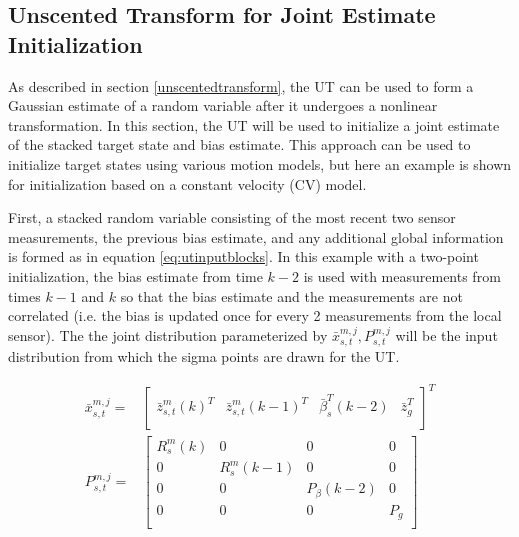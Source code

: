 \documentclass[journal]{IEEEtran}
\begin{document}
\subsection{Unscented Transform for Joint Estimate Initialization} \label{utinitialization}
As described in section \ref{unscentedtransform}, the UT can be used to form a Gaussian estimate of a random variable after it undergoes a nonlinear transformation. In this section, the UT will be used to initialize a joint estimate of the stacked target state and bias estimate. This approach can be used to initialize target states using various motion models, but here an example is shown for initialization based on a constant velocity (CV) model.

First, a stacked random variable consisting of the most recent two sensor measurements, the previous bias estimate, and any additional global information is formed as in equation \ref{eq:utinputblocks}. In this example with a two-point initialization, the bias estimate from time $k-2$ is used with measurements from times $k-1$ and $k$ so that the bias estimate and the measurements are not correlated (i.e. the bias is updated once for every 2 measurements from the local sensor). The the joint distribution parameterized by $\bar{x}_{s,t}^{m,j}, P_{s,t}^{m,j}$ will be the input distribution from which the sigma points are drawn for the UT.

\begin{equation}
\begin{aligned}
    \bar{x}_{s,t}^{m,j} = {}& \begin{bmatrix}
                        \bar{z}_{s,t}^{m}(k)^{T} & \bar{z}_{s,t}^{m}(k-1)^{T} & \bar{\beta}_{s}^{T}(k-2) & 
                        \bar{z}_{g}^T \\
                    \end{bmatrix}^{T} \\
    P_{s,t}^{m,j} = {}& \begin{bmatrix}
                        R_{s}^{m}(k) & 0 & 0 & 0 \\
                        0 & R_{s}^{m}(k-1) & 0 & 0 \\
                        0 & 0 & P_{\beta}(k-2) & 0\\
                        0 & 0 & 0 & P_{g} \\
                    \end{bmatrix} \\
\end{aligned} \label{eq:utinputblocks}
\end{equation}
\end{document}
